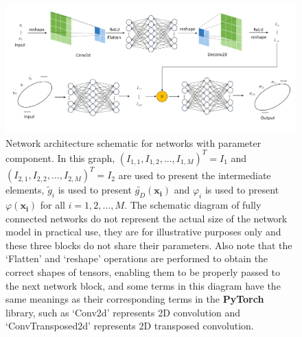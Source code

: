\documentclass{article}
\begin{document}
\begin{figure}[ht]
    \centering
    \includegraphics[width = 0.98\linewidth]{network.png}
    \caption{Network architecture schematic for networks with parameter component. In this graph, $(I_{1, 1}, I_{1, 2}, ..., I_{1, M})^{T} = I_1$ and $(I_{2, 1}, I_{2, 2}, ..., I_{2, M})^{T} = I_2$ are used to present the intermediate elements, $\widetilde{g}_i$ is used to present $\widetilde{g_D}(\mathbf{x_i})$ and $\varphi_i$ is used to present $\varphi(\mathbf{x_i})$ for all $i = 1, 2, ..., M$. The schematic diagram of fully connected networks do not represent the actual size of the network model in practical use, they are for illustrative purposes only and these three blocks do not share their parameters. Also note that the `Flatten' and `reshape' operations are performed to obtain the correct shapes of tensors, enabling them to be properly passed to the next network block, and some terms in this diagram have the same meanings as their corresponding terms in the \textbf{PyTorch} library, such as `Conv2d' represents 2D convolution and `ConvTransposed2d' represents 2D transposed convolution.} \label{fig:networks}
\end{figure}
\end{document}

